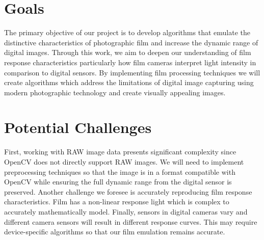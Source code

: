 \documentclass[
	a4paper, %
	10pt, %
	unnumberedsections, %
	twoside, %
]{LTJournalArticle}
\begin{document}
\section{Goals}

The primary objective of our project is to develop algorithms that emulate the distinctive characteristics of photographic film and increase the dynamic range of digital images. Through this work, we aim to deepen our understanding of film response characteristics particularly how film cameras interpret light intensity in comparison to digital sensors. By implementing film processing techniques we will create algorithms which address the limitations of digital image capturing using modern photographic technology and create visually appealing images. 

\section{Potential Challenges}

First, working with RAW image data presents significant complexity since OpenCV does not directly support RAW images. We will need to implement preprocessing techniques so that the image is in a format compatible with OpenCV while ensuring the full dynamic range from the digital sensor is preserved. Another challenge we foresee is accurately reproducing film response characteristics. Film has a non-linear response light which is complex to accurately mathematically model. Finally, sensors in digital cameras vary and different camera sensors will result in different response curves. This may require device-specific algorithms so that our film emulation remains accurate. 


\printbibliography %

\end{document}
